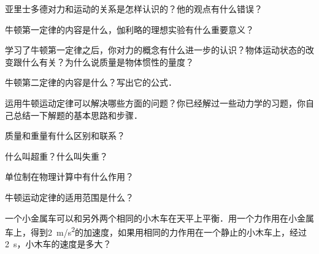 \begin{Test}
\begin{QsNum}
    \item 亚里士多德对力和运动的关系是怎样认识的？他的观点有什么错误？
    \item 牛顿第一定律的内容是什么，伽利略的理想实验有什么重要意义？
    \item 学习了牛顿第一定律之后，你对力的概念有什么进一步的认识？物体运动状态的改变跟什么有关？为什么说质量是物体惯性的量度？
    \item 牛顿第二定律的内容是什么？写出它的公式．
    \item 运用牛顿运动定律可以解决哪些方面的问题？你已经解过一些动力学的习题，你自己总结一下解题的基本思路和步骤．
    \item 质量和重量有什么区别和联系？
    \item 什么叫超重？什么叫失重？
    \item 单位制在物理计算中有什么作用？
    \item 牛顿运动定律的适用范围是什么？

    \item 一个小金属车可以和另外两个相同的小木车在天平上平衡．用一个力作用在小金属车上，得到\SI{2}{m/s^2}的加速度，如果用相同的力作用在一个静止的小木车上，经过\SI{2}{s}，小木车的速度是多大？


\end{QsNum}
\end{Test}
